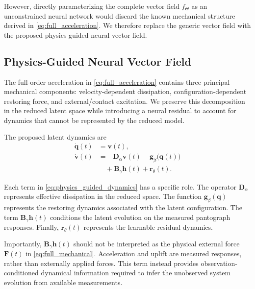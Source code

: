 \documentclass[journal,twoside]{IEEEtran}
\begin{document}
However, directly parameterizing the complete vector field
$f_{\Theta}$ as an unconstrained neural network would discard the known
mechanical structure derived in
\eqref{eq:full_acceleration}. We therefore replace the generic vector field
with the proposed physics-guided neural vector field.


\subsection{Physics-Guided Neural Vector Field}
\label{subsec:physics_guided}

The full-order acceleration in \eqref{eq:full_acceleration} contains three
principal mechanical components: velocity-dependent dissipation,
configuration-dependent restoring force, and external/contact excitation.
We preserve this decomposition in the reduced latent space while introducing
a neural residual to account for dynamics that cannot be represented by the
reduced model.

The proposed latent dynamics are
\begin{equation}
\begin{aligned}
    \dot{\mathbf{q}}(t)
        &=\mathbf{v}(t),\\
    \dot{\mathbf{v}}(t)
        &=
        -\mathbf{D}_{\alpha}\mathbf{v}(t)
        -\mathbf{g}_{\beta}\big(\mathbf{q}(t)\big)\\
        &\quad
        +\mathbf{B}_{\gamma}\mathbf{h}(t)
        +\mathbf{r}_{\theta}(t).
\end{aligned}
\label{eq:physics_guided_dynamics}
\end{equation}

Each term in \eqref{eq:physics_guided_dynamics} has a specific role. The
operator $\mathbf{D}_{\alpha}$ represents effective dissipation in the
reduced space. The function
$\mathbf{g}_{\beta}(\mathbf{q})$ represents the restoring dynamics associated
with the latent configuration. The term
$\mathbf{B}_{\gamma}\mathbf{h}(t)$ conditions the latent evolution on the
measured pantograph responses. Finally,
$\mathbf{r}_{\theta}(t)$ represents the learnable residual dynamics.

Importantly, $\mathbf{B}_{\gamma}\mathbf{h}(t)$ should not be interpreted as
the physical external force $\mathbf{F}(t)$ in
\eqref{eq:full_mechanical}. Acceleration and uplift are measured responses,
rather than externally applied forces. This term instead provides
observation-conditioned dynamical information required to infer the
unobserved system evolution from available measurements.
\end{document}
